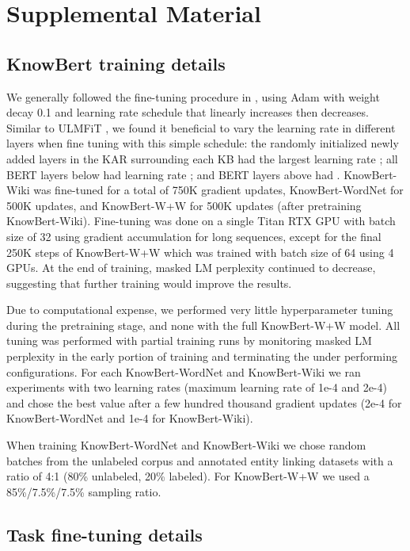 \documentclass[11pt,a4paper]{article}
\newcommand{\KWIKI}[0]{KnowBert-Wiki}
\newcommand{\KWIKIS}[0]{KnowBert-Wiki }
\newcommand{\KWORDNETS}[0]{KnowBert-WordNet }
\newcommand{\KWANDWS}[0]{KnowBert-W+W }
\begin{document}



\appendix

\section{Supplemental Material}

\subsection{KnowBert training details}
We generally followed the fine-tuning procedure in \citet{Devlin2018}, using Adam \cite{Kingma2014AdamAM} with weight decay 0.1 and learning rate schedule that linearly increases then decreases.
Similar to ULMFiT \cite{Howard2018}, we found it beneficial to vary the learning rate in different layers when fine tuning with this simple schedule: the randomly initialized newly added layers in the KAR surrounding each KB had the largest learning rate ; all BERT layers below had learning rate ; and BERT layers above had .
\KWIKIS was fine-tuned for a total of 750K gradient updates, \KWORDNETS for 500K updates, and \KWANDWS for 500K updates (after pretraining \KWIKI).
Fine-tuning was done on a single Titan RTX GPU with batch size of 32 using gradient accumulation for long sequences, except for the final 250K steps of \KWANDWS which was trained with batch size of 64 using 4 GPUs.
At the end of training, masked LM perplexity continued to decrease, suggesting that further training would improve the results.

Due to computational expense, we performed very little hyperparameter tuning during the pretraining stage, and none with the full \KWANDWS model.
All tuning was performed with partial training runs by monitoring masked LM perplexity in the early portion of training and terminating the under performing configurations.
For each \KWORDNETS and \KWIKIS we ran experiments with two learning rates (maximum learning rate of 1e-4 and 2e-4) and chose the best value after a few hundred thousand gradient updates (2e-4 for \KWORDNETS and 1e-4 for \KWIKI).

When training \KWORDNETS and \KWIKIS we chose random batches from the unlabeled corpus and annotated entity linking datasets with a ratio of 4:1 (80\% unlabeled, 20\% labeled).
For \KWANDWS we used a 85\%/7.5\%/7.5\% sampling ratio.

\subsection{Task fine-tuning details}
\end{document}
